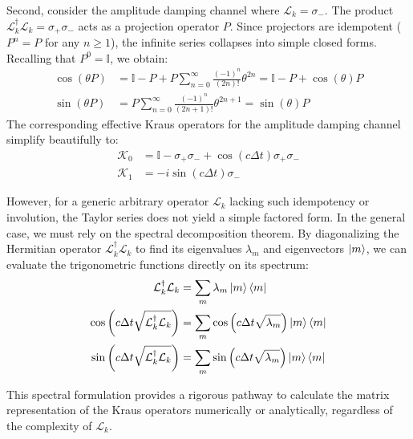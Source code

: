 \documentclass[a4paper,12pt]{article}
\begin{document}
Second, consider the amplitude damping channel where $\mathcal{L}_{k} = \sigma_{-}$. The product $\mathcal{L}_{k}^{\dagger} \mathcal{L}_{k} = \sigma_{+} \sigma_{-}$ acts as a projection operator $P$. Since projectors are idempotent ($P^n = P$ for any $n \ge 1$), the infinite series collapses into simple closed forms. Recalling that $P^0 = \mathbb{I}$, we obtain:
\begin{align}
	\cos(\theta P) &= \mathbb{I} - P + P \sum_{n=0}^{\infty} \frac{(-1)^n}{(2n)!} \theta^{2n} = \mathbb{I} - P + \cos(\theta) P \\
	\sin(\theta P) &= P \sum_{n=0}^{\infty} \frac{(-1)^n}{(2n+1)!} \theta^{2n+1} = \sin(\theta) P
\end{align}
The corresponding effective Kraus operators for the amplitude damping channel simplify beautifully to:
\begin{align}
	\mathcal{K}_{0} &= \mathbb{I} - \sigma_{+}\sigma_{-} + \cos(c \Delta t) \sigma_{+}\sigma_{-} \\
	\mathcal{K}_{1} &= -i \sin(c \Delta t) \sigma_{-}
\end{align}

However, for a generic arbitrary operator $\mathcal{L}_{k}$ lacking such idempotency or involution, the Taylor series does not yield a simple factored form. In the general case, we must rely on the spectral decomposition theorem. By diagonalizing the Hermitian operator $\mathcal{L}_{k}^{\dagger} \mathcal{L}_{k}$ to find its eigenvalues $\lambda_m$ and eigenvectors $\ket{m}$, we can evaluate the trigonometric functions directly on its spectrum:
\begin{align}
	\mathcal{L}_{k}^{\dagger} \mathcal{L}_{k} &= \sum_{m} \lambda_m \ket{m}\bra{m} \\
	\cos\left(c \Delta t \sqrt{\mathcal{L}_{k}^{\dagger} \mathcal{L}_{k}}\right) &= \sum_{m} \cos\left(c \Delta t \sqrt{\lambda_m}\right) \ket{m}\bra{m} \\
	\sin\left(c \Delta t \sqrt{\mathcal{L}_{k}^{\dagger} \mathcal{L}_{k}}\right) &= \sum_{m} \sin\left(c \Delta t \sqrt{\lambda_m}\right) \ket{m}\bra{m}
\end{align}

This spectral formulation provides a rigorous pathway to calculate the matrix representation of the Kraus operators numerically or analytically, regardless of the complexity of $\mathcal{L}_{k}$.
\end{document}
